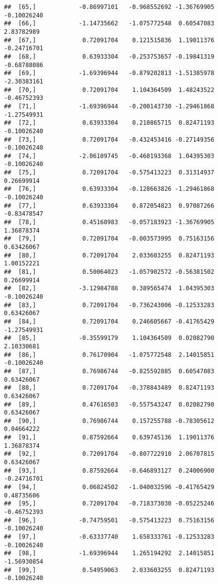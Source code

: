 \documentclass[
]{article}
\begin{document}
\begin{verbatim}
##  [65,]            -0.86997101   -0.968552692 -1.36769905    -0.10026240
##  [66,]            -1.14735662   -1.075772548  0.60547083     2.83782989
##  [67,]             0.72091704    0.121515836  1.19011376    -0.24716701
##  [68,]             0.63933304   -0.253753657 -0.19841319    -0.68788086
##  [69,]            -1.69396944   -0.879202813 -1.51385978    -2.30383161
##  [70,]             0.72091704    1.104364509  1.48243522    -0.46752393
##  [71,]            -1.69396944   -0.200143730 -1.29461868    -1.27549931
##  [72,]             0.63933304    0.210865715  0.82471193    -0.10026240
##  [73,]             0.72091704   -0.432453416 -0.27149356    -0.10026240
##  [74,]            -2.06109745   -0.468193368  1.04395303    -0.10026240
##  [75,]             0.72091704   -0.575413223  0.31314937     0.26699914
##  [76,]             0.63933304   -0.128663826 -1.29461868    -0.10026240
##  [77,]             0.63933304    0.872054823  0.97087266    -0.83478547
##  [78,]             0.45168983   -0.057183923 -1.36769905     1.36878374
##  [79,]             0.72091704   -0.003573995  0.75163156     0.63426067
##  [80,]             0.72091704    2.033603255  0.82471193     1.00152221
##  [81,]             0.50064023   -1.057902572 -0.56381502     0.26699914
##  [82,]            -3.12984788    0.389565474  1.04395303    -0.10026240
##  [83,]             0.72091704   -0.736243006 -0.12533283     0.63426067
##  [84,]             0.72091704    0.246605667 -0.41765429    -1.27549931
##  [85,]            -0.35599179    1.104364509  0.02082790     2.10330681
##  [86,]             0.76170904   -1.075772548  2.14015851    -0.10026240
##  [87,]             0.76986744   -0.825592885  0.60547083     0.63426067
##  [88,]             0.72091704   -0.378843489  0.82471193     0.63426067
##  [89,]             0.47616503   -0.557543247  0.02082790     0.63426067
##  [90,]             0.76986744    0.157255788 -0.78305612     0.04664222
##  [91,]             0.87592664    0.639745136  1.19011376     1.36878374
##  [92,]             0.72091704   -0.807722910  2.06707815     0.63426067
##  [93,]             0.87592664   -0.646893127  0.24006900    -0.24716701
##  [94,]             0.06824502   -1.040032596 -0.41765429     0.48735606
##  [95,]             0.72091704   -0.718373030 -0.05225246    -0.46752393
##  [96,]            -0.74759501   -0.575413223  0.75163156    -0.10026240
##  [97,]            -0.63337740    1.658333761 -0.12533283    -0.10026240
##  [98,]            -1.69396944    1.265194292  2.14015851    -1.56930854
##  [99,]             0.54959063    2.033603255  0.82471193    -0.10026240

\end{verbatim}
\end{document}
